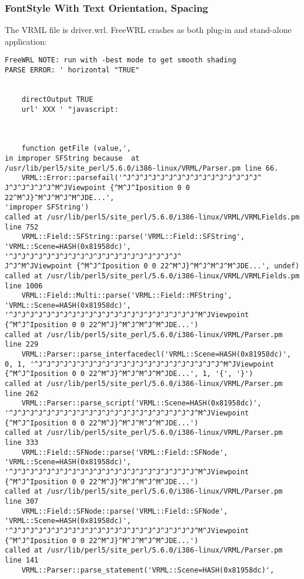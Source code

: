 \documentclass[12pt,letterpaper]{article}
\newcommand{\FSG}{FontStyle With Text Orientation, Spacing}
\begin{document}
\subsubsection{\FSG}
The VRML file is driver.wrl.\newline
FreeWRL crashes as both plug-in and stand-alone application:
\begin{verbatim}
FreeWRL NOTE: run with -best mode to get smooth shading
PARSE ERROR: ' horizontal "TRUE"
	
	
	directOutput TRUE
	url' XXX ' "javascript: 
	
	
	
	function getFile (value,',
in improper SFString because  at
/usr/lib/perl5/site_perl/5.6.0/i386-linux/VRML/Parser.pm line 66.
	VRML::Error::parsefail('^J^J^J^J^J^J^J^J^J^J^J^J^J^J^J^J^
J^J^J^J^J^J^M^JViewpoint {^M^J^Iposition 0 0 22^M^J}^M^J^M^J^M^JDE...',
'improper SFString')
called at /usr/lib/perl5/site_perl/5.6.0/i386-linux/VRML/VRMLFields.pm
line 752
	VRML::Field::SFString::parse('VRML::Field::SFString',
'VRML::Scene=HASH(0x81958dc)', '^J^J^J^J^J^J^J^J^J^J^J^J^J^J^J^J^J^J^J^J^
J^J^M^JViewpoint {^M^J^Iposition 0 0 22^M^J}^M^J^M^J^M^JDE...', undef)
called at /usr/lib/perl5/site_perl/5.6.0/i386-linux/VRML/VRMLFields.pm
line 1006
	VRML::Field::Multi::parse('VRML::Field::MFString',
'VRML::Scene=HASH(0x81958dc)',
'^J^J^J^J^J^J^J^J^J^J^J^J^J^J^J^J^J^J^J^J^J^J^M^JViewpoint
{^M^J^Iposition 0 0 22^M^J}^M^J^M^J^M^JDE...')
called at /usr/lib/perl5/site_perl/5.6.0/i386-linux/VRML/Parser.pm
line 229
	VRML::Parser::parse_interfacedecl('VRML::Scene=HASH(0x81958dc)',
0, 1, '^J^J^J^J^J^J^J^J^J^J^J^J^J^J^J^J^J^J^J^J^J^J^M^JViewpoint
{^M^J^Iposition 0 0 22^M^J}^M^J^M^J^M^JDE...', 1, '{', '}')
called at /usr/lib/perl5/site_perl/5.6.0/i386-linux/VRML/Parser.pm
line 262
	VRML::Parser::parse_script('VRML::Scene=HASH(0x81958dc)',
'^J^J^J^J^J^J^J^J^J^J^J^J^J^J^J^J^J^J^J^J^J^J^M^JViewpoint
{^M^J^Iposition 0 0 22^M^J}^M^J^M^J^M^JDE...')
called at /usr/lib/perl5/site_perl/5.6.0/i386-linux/VRML/Parser.pm
line 333
	VRML::Field::SFNode::parse('VRML::Field::SFNode',
'VRML::Scene=HASH(0x81958dc)',
'^J^J^J^J^J^J^J^J^J^J^J^J^J^J^J^J^J^J^J^J^J^J^M^JViewpoint
{^M^J^Iposition 0 0 22^M^J}^M^J^M^J^M^JDE...')
called at /usr/lib/perl5/site_perl/5.6.0/i386-linux/VRML/Parser.pm
line 307
	VRML::Field::SFNode::parse('VRML::Field::SFNode',
'VRML::Scene=HASH(0x81958dc)',
'^J^J^J^J^J^J^J^J^J^J^J^J^J^J^J^J^J^J^J^J^J^J^M^JViewpoint
{^M^J^Iposition 0 0 22^M^J}^M^J^M^J^M^JDE...')
called at /usr/lib/perl5/site_perl/5.6.0/i386-linux/VRML/Parser.pm
line 141
	VRML::Parser::parse_statement('VRML::Scene=HASH(0x81958dc)',

\end{verbatim}
\end{document}
